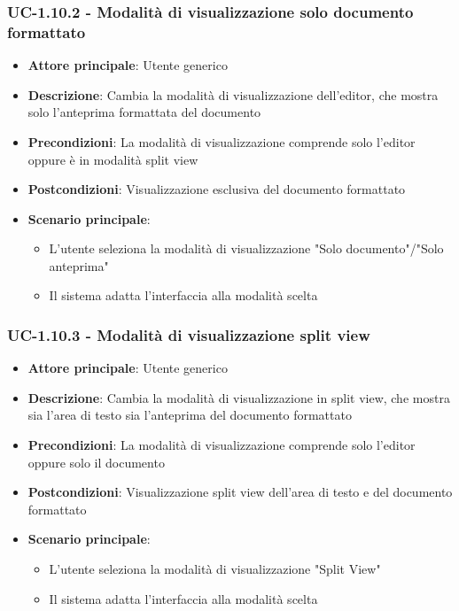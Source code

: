 \documentclass[11pt,a4paper]{article}
\begin{document}
\subsubsection{UC-1.10.2 - Modalità di visualizzazione solo documento formattato}
\begin{itemize}
    \item \textbf{Attore principale}: Utente generico
    \item \textbf{Descrizione}: Cambia la modalità di visualizzazione dell'editor, che mostra solo l'anteprima formattata del documento
    \item \textbf{Precondizioni}: La modalità di visualizzazione comprende solo l’editor oppure è in modalità split view
    \item \textbf{Postcondizioni}: Visualizzazione esclusiva del documento formattato
    \item \textbf{Scenario principale}:
        \begin{itemize}
            \item L'utente seleziona la modalità di visualizzazione "Solo documento"/"Solo anteprima"
            \item Il sistema adatta l'interfaccia alla modalità scelta
        \end{itemize}
\end{itemize}

\subsubsection{UC-1.10.3 - Modalità di visualizzazione split view}
\begin{itemize}
    \item \textbf{Attore principale}: Utente generico
    \item \textbf{Descrizione}: Cambia la modalità di visualizzazione in split view, che mostra sia l'area di testo sia l'anteprima del documento formattato
    \item \textbf{Precondizioni}: La modalità di visualizzazione comprende solo l’editor oppure solo il documento
    \item \textbf{Postcondizioni}: Visualizzazione split view dell’area di testo e del documento formattato
    \item \textbf{Scenario principale}:
        \begin{itemize}
            \item L'utente seleziona la modalità di visualizzazione "Split View"
            \item Il sistema adatta l'interfaccia alla modalità scelta
        \end{itemize}
\end{itemize}
\end{document}
